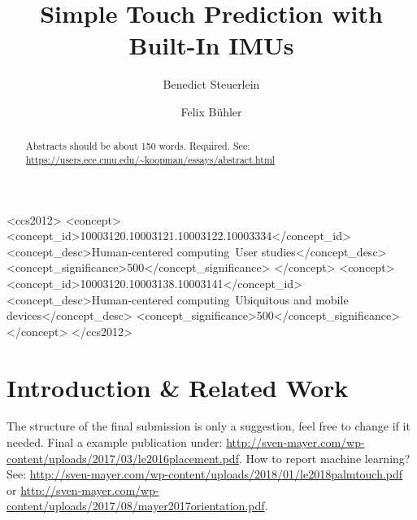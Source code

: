 \documentclass[sigchi-a, authorversion]{acmart}
\begin{document}
\title{Simple Touch Prediction with Built-In IMUs}

\author{Benedict Steuerlein}

\author{Felix Bühler}


\renewcommand{\shortauthors}{F. Author et al.}


%
%


\begin{CCSXML}
<ccs2012>
 <concept>
<concept_id>10003120.10003121.10003122.10003334</concept_id>
<concept_desc>Human-centered computing~User studies</concept_desc>
<concept_significance>500</concept_significance>
</concept>
<concept>
<concept_id>10003120.10003138.10003141</concept_id>
<concept_desc>Human-centered computing~Ubiquitous and mobile devices</concept_desc>
<concept_significance>500</concept_significance>
</concept>
</ccs2012>
\end{CCSXML}



\begin{abstract}
Abstracts should be about 150 words. Required. See: \url{https://users.ece.cmu.edu/~koopman/essays/abstract.html}
\end{abstract}



\maketitle

\section{Introduction \& Related Work}
The structure of the final submission is only a suggestion, feel free to change if it needed. Final a example publication under: \url{http://sven-mayer.com/wp-content/uploads/2017/03/le2016placement.pdf}. How to report machine learning? See: \url{http://sven-mayer.com/wp-content/uploads/2018/01/le2018palmtouch.pdf} or \url{http://sven-mayer.com/wp-content/uploads/2017/08/mayer2017orientation.pdf}.
\end{document}
